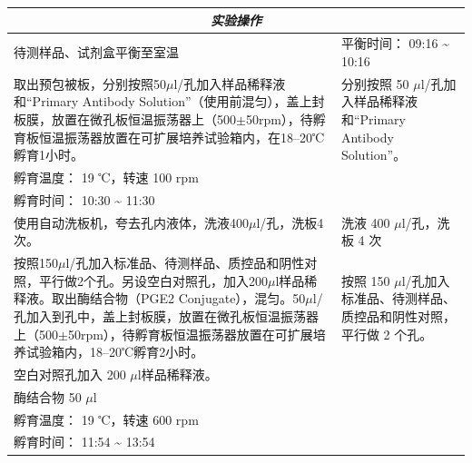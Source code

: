 \documentclass[UTF8,10pt,a4paper,fontset=fandol]{ctexart}
\newcommand{\fieldvalue}[1]{#1}
\newcommand{\handwritten}[1]{#1}
\begin{document}
\begin{center}
\begin{center}
\begin{tabularx}{\textwidth}{|p{}|X|}
\hline
\multicolumn{2}{|c|}{\textit{实验操作}}\\
\hline
待测样品、试剂盒平衡至室温 &
平衡时间：
\fieldvalue{\handwritten{09:16}}
\quad\textasciitilde\quad
\fieldvalue{\handwritten{10:16}}\\
\hline
取出预包被板，分别按照50$\mu$l/孔加入样品稀释液和“Primary Antibody Solution”（使用前混匀），盖上封板膜，放置在微孔板恒温振荡器上（500$\pm$50rpm），待孵育板恒温振荡器放置在可扩展培养试验箱内，在18--20℃孵育1小时。 &
分别按照
\fieldvalue{\handwritten{50}}
$\mu$l/孔加入样品稀释液和“Primary Antibody Solution”。\\
孵育温度：
\fieldvalue{\handwritten{19}}
℃，转速
\fieldvalue{\handwritten{100}}
rpm\\
孵育时间：
\fieldvalue{\handwritten{10:30}}
\quad\textasciitilde\quad
\fieldvalue{\handwritten{11:30}}\\
\hline
使用自动洗板机，夸去孔内液体，洗液400$\mu$l/孔，洗板4次。 &
洗液
\fieldvalue{\handwritten{400}}
$\mu$l/孔，洗板
\fieldvalue{\handwritten{4}}
次\\
\hline
按照150$\mu$l/孔加入标准品、待测样品、质控品和阴性对照，平行做2个孔。另设空白对照孔，加入200$\mu$l样品稀释液。取出酶结合物（PGE2 Conjugate），混匀。50$\mu$l/孔加入到孔中，盖上封板膜，放置在微孔板恒温振荡器上（500$\pm$50rpm），待孵育板恒温振荡器放置在可扩展培养试验箱内，18--20℃孵育2小时。 &
按照
\fieldvalue{\handwritten{150}}
$\mu$l/孔加入标准品、待测样品、质控品和阴性对照，平行做
\fieldvalue{\handwritten{2}}
个孔。\\
空白对照孔加入
\fieldvalue{\handwritten{200}}
$\mu$l样品稀释液。\\
酶结合物
\fieldvalue{\handwritten{50}}
$\mu$l\\
孵育温度：
\fieldvalue{\handwritten{19}}
℃，转速
\fieldvalue{\handwritten{600}}
rpm\\
孵育时间：
\fieldvalue{\handwritten{11:54}}
\quad\textasciitilde\quad
\fieldvalue{\handwritten{13:54}}\\
\hline
\end{tabularx}


\end{center}
\end{center}
\end{document}
